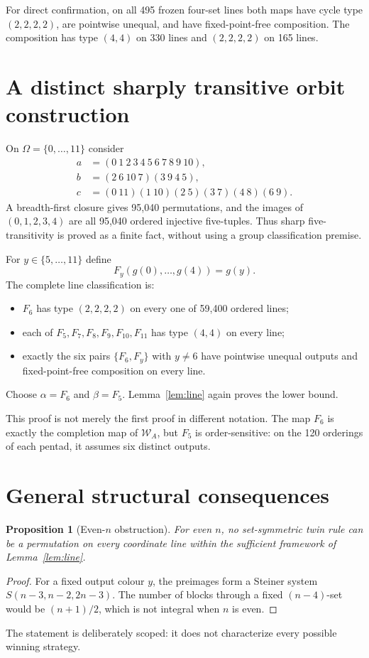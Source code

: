 \documentclass[11pt]{article}
\newtheorem{proposition}{Proposition}
\begin{document}
For direct confirmation, on all 495 frozen four-set lines both maps have cycle
type $(2,2,2,2)$, are pointwise unequal, and have fixed-point-free
composition. The composition has type $(4,4)$ on 330 lines and
$(2,2,2,2)$ on 165 lines.

\section{A distinct sharply transitive orbit construction}
On $\Omega=\{0,\ldots,11\}$ consider
\[
\begin{aligned}
 a&=(0\ 1\ 2\ 3\ 4\ 5\ 6\ 7\ 8\ 9\ 10),\\
 b&=(2\ 6\ 10\ 7)(3\ 9\ 4\ 5),\\
 c&=(0\ 11)(1\ 10)(2\ 5)(3\ 7)(4\ 8)(6\ 9).
\end{aligned}
\]
A breadth-first closure gives 95,040 permutations, and the images of
$(0,1,2,3,4)$ are all 95,040 ordered injective five-tuples. Thus sharp
five-transitivity is proved as a finite fact, without using a group
classification premise.

For $y\in\{5,\ldots,11\}$ define
\[
 F_y(g(0),\ldots,g(4))=g(y).
\]
The complete line classification is:
\begin{itemize}[nosep]
\item $F_6$ has type $(2,2,2,2)$ on every one of 59,400 ordered lines;
\item each of $F_5,F_7,F_8,F_9,F_{10},F_{11}$ has type $(4,4)$ on every line;
\item exactly the six pairs $\{F_6,F_y\}$ with $y\ne6$ have pointwise
unequal outputs and fixed-point-free composition on every line.
\end{itemize}
Choose $\alpha=F_6$ and $\beta=F_5$. Lemma~\ref{lem:line} again proves the
lower bound.

This proof is not merely the first proof in different notation. The map
$F_6$ is exactly the completion map of $\mathcal W_A$, but $F_5$ is
order-sensitive: on the 120 orderings of each pentad, it assumes six distinct
outputs.

\section{General structural consequences}
\begin{proposition}[Even-$n$ obstruction]\label{prop:even}
For even $n$, no set-symmetric twin rule can be a permutation on every
coordinate line within the sufficient framework of Lemma~\ref{lem:line}.
\end{proposition}
\begin{proof}
For a fixed output colour $y$, the preimages form a Steiner system
$S(n-3,n-2,2n-3)$. The number of blocks through a fixed $(n-4)$-set would be
$(n+1)/2$, which is not integral when $n$ is even.
\end{proof}
The statement is deliberately scoped: it does not characterize every possible
winning strategy.
\end{document}
